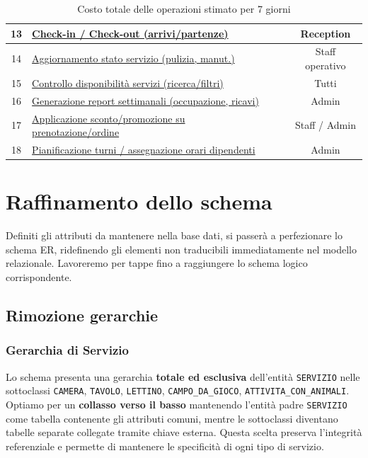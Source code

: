 \documentclass[a4paper,12pt]{report}
\begin{document}
\begin{table}[H]
\begin{tabularx}{\textwidth}{|c|>{\raggedright\arraybackslash}X|c|c|}
		\hline
		13          & \hyperref[op13]{Check-in / Check-out (arrivi/partenze)}                &                           & Reception              \\
		\hline
		14          & \hyperref[op14]{Aggiornamento stato servizio (pulizia, manut.)}        &                           & Staff operativo        \\
		\hline
		15          & \hyperref[op15]{Controllo disponibilità servizi (ricerca/filtri)}      &                           & Tutti                  \\
		\hline
		16          & \hyperref[op16]{Generazione report settimanali (occupazione, ricavi)}  &                           & Admin                  \\
		\hline
		17          & \hyperref[op17]{Applicazione sconto/promozione su prenotazione/ordine} &                           & Staff / Admin          \\
		\hline
		18          & \hyperref[op18]{Pianificazione turni / assegnazione orari dipendenti}  &                           & Admin                  \\
		\hline
	\end{tabularx}
	\caption{Costo totale delle operazioni stimato per 7 giorni}
	\label{tab:riepilogo-operazioni-settimanali}
\end{table}

\section{Raffinamento dello schema}
Definiti gli attributi da mantenere nella base dati, si passerà a perfezionare lo schema ER, ridefinendo gli elementi non
traducibili immediatamente nel modello relazionale. Lavoreremo per tappe fino a raggiungere lo schema logico corrispondente.

\subsection{Rimozione gerarchie}

\subsubsection*{Gerarchia di Servizio}
Lo schema presenta una gerarchia \textbf{totale ed esclusiva} dell'entità \texttt{SERVIZIO} nelle sottoclassi \texttt{CAMERA}, \texttt{TAVOLO}, \texttt{LETTINO}, \texttt{CAMPO\_DA\_GIOCO}, \texttt{ATTIVITA\_CON\_ANIMALI}. \\
Optiamo per un \textbf{collasso verso il basso} mantenendo l'entità padre \texttt{SERVIZIO} come tabella contenente gli attributi comuni, mentre le sottoclassi diventano tabelle separate collegate tramite chiave esterna. Questa scelta preserva l'integrità referenziale e permette di mantenere le specificità di ogni tipo di servizio.
\end{document}
